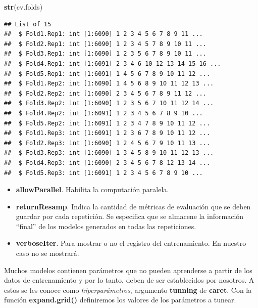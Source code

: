 \documentclass[]{article}
\newenvironment{Shaded}{\begin{snugshade}}{\end{snugshade}}
\newcommand{\KeywordTok}[1]{\textcolor[rgb]{0.13,0.29,0.53}{\textbf{#1}}}
\newcommand{\NormalTok}[1]{#1}
\providecommand{\tightlist}{%
  \setlength{\itemsep}{0pt}\setlength{\parskip}{0pt}}
\begin{document}
\vspace{2mm}

\begin{Shaded}
\begin{Highlighting}[]
\KeywordTok{str}\NormalTok{(cv.folds)}
\end{Highlighting}
\end{Shaded}

\begin{verbatim}
## List of 15
##  $ Fold1.Rep1: int [1:6090] 1 2 3 4 5 6 7 8 9 11 ...
##  $ Fold2.Rep1: int [1:6090] 1 2 3 4 5 7 8 9 10 11 ...
##  $ Fold3.Rep1: int [1:6090] 1 2 3 5 6 7 8 9 10 11 ...
##  $ Fold4.Rep1: int [1:6091] 2 3 4 6 10 12 13 14 15 16 ...
##  $ Fold5.Rep1: int [1:6091] 1 4 5 6 7 8 9 10 11 12 ...
##  $ Fold1.Rep2: int [1:6090] 1 4 5 6 8 9 10 11 12 13 ...
##  $ Fold2.Rep2: int [1:6090] 2 3 4 5 6 7 8 9 11 12 ...
##  $ Fold3.Rep2: int [1:6090] 1 2 3 5 6 7 10 11 12 14 ...
##  $ Fold4.Rep2: int [1:6091] 1 2 3 4 5 6 7 8 9 10 ...
##  $ Fold5.Rep2: int [1:6091] 1 2 3 4 7 8 9 10 11 12 ...
##  $ Fold1.Rep3: int [1:6091] 1 2 3 6 7 8 9 10 11 12 ...
##  $ Fold2.Rep3: int [1:6090] 1 2 4 5 6 7 9 10 11 13 ...
##  $ Fold3.Rep3: int [1:6090] 1 3 4 5 8 9 10 11 12 13 ...
##  $ Fold4.Rep3: int [1:6090] 2 3 4 5 6 7 8 12 13 14 ...
##  $ Fold5.Rep3: int [1:6091] 1 2 3 4 5 6 7 8 9 10 ...
\end{verbatim}

\vspace{2mm}

\begin{itemize}
\tightlist
\item
  \textbf{allowParallel}. Habilita la computación paralela. 

\item
  \textbf{returnResamp}. Indica la cantidad de métricas de evaluación que se deben guardar por cada repetición. Se especifica que se almacene la información ``final'' de los modelos generados en todas las repeticiones. 
  
\item
  \textbf{verboseIter}. Para mostrar o no el registro del entrenamiento. En nuestro caso no se mostrará.
\end{itemize}

Muchos modelos contienen parámetros que no pueden aprenderse a partir de
los datos de entrenamiento y por lo tanto, deben de ser establecidos
por nosotros. A estos se les conoce como \emph{hiperparámetros},
argumento \textbf{tunning} de \textbf{caret}. Con la función
\textbf{expand.grid()} definiremos los valores de los parámetros a tunear.
\end{document}

